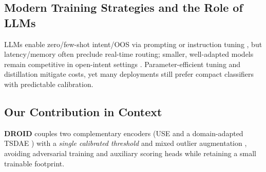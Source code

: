 \documentclass[journal,letterpaper]{IEEEtran}
\begin{document}
\subsection{Modern Training Strategies and the Role of LLMs}
LLMs enable zero/few-shot intent/OOS via prompting or instruction tuning \cite{marzagao-etal-2024-beyond,zhang-etal-2024-discrimination,arora-varma-2024-intent}, but latency/memory often preclude real-time routing; smaller, well-adapted models remain competitive in open-intent settings \cite{arora-varma-2024-intent,marzagao-etal-2024-beyond}. Parameter-efficient tuning and distillation mitigate costs, yet many deployments still prefer compact classifiers with predictable calibration.

\subsection{Our Contribution in Context}
\textbf{DROID} couples two complementary encoders (USE \cite{Daniel_2018} and a domain-adapted TSDAE \cite{Wang_2021}) with a \emph{single calibrated threshold} and mixed outlier augmentation \cite{Zhan_2021}, avoiding adversarial training and auxiliary scoring heads while retaining a small trainable footprint.
\end{document}
